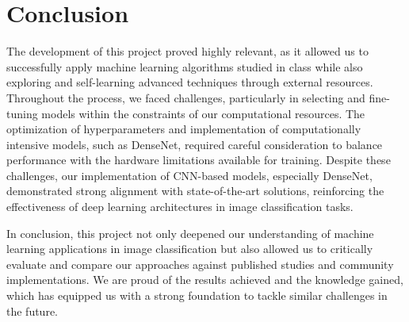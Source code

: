 \section{Conclusion}

The development of this project proved highly relevant, as it allowed us to successfully apply machine learning algorithms studied in class while also exploring and self-learning advanced techniques through external resources. Throughout the process, we faced challenges, particularly in selecting and fine-tuning models within the constraints of our computational resources. The optimization of hyperparameters and implementation of computationally intensive models, such as DenseNet, required careful consideration to balance performance with the hardware limitations available for training. Despite these challenges, our implementation of CNN-based models, especially DenseNet, demonstrated strong alignment with state-of-the-art solutions, reinforcing the effectiveness of deep learning architectures in image classification tasks.

In conclusion, this project not only deepened our understanding of machine learning applications in image classification but also allowed us to critically evaluate and compare our approaches against published studies and community implementations. We are proud of the results achieved and the knowledge gained, which has equipped us with a strong foundation to tackle similar challenges in the future.